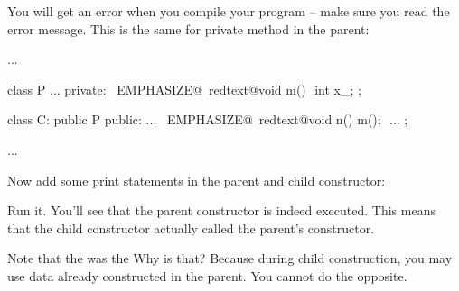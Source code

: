 You will get an error when you compile your program -- make sure you
read the error message. This is the same for private method in the
parent:
\begin{console}[commandchars=\~\@\$]
...

class P
{     
...
private:
        ~EMPHASIZE@~redtext@void m() {}$$
        int x_;
};

class C: public P
{
public:
        ...
        ~EMPHASIZE@~redtext@void n() { m(); }$$
        ...
};

...
\end{console}

\newpage{}

Now add some print statements in the parent and child constructor:

Run it. You'll see that the parent constructor is indeed executed. This means that the child constructor actually called the parent's constructor.

Note that the  was  the  Why is that? Because during child construction, you may use data already constructed in the parent. You cannot do the opposite.

